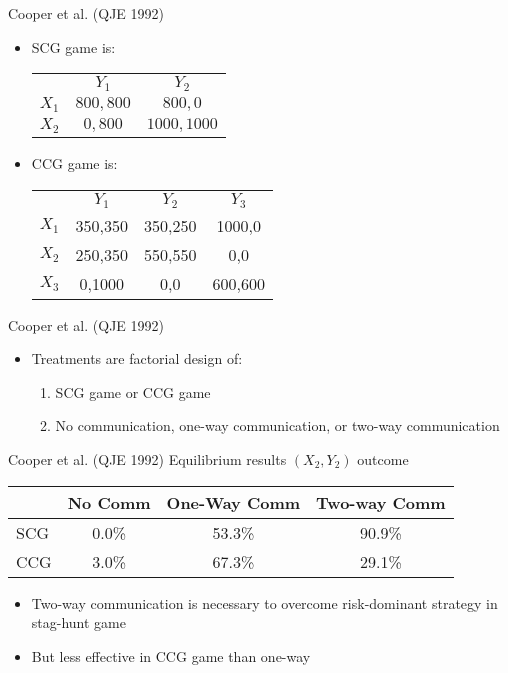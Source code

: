 \documentclass{beamer}
\begin{document}
\begin{frame}{Cooper et al. (QJE 1992)}
	\begin{itemize}
		\item SCG game is:
		\begin{center}
		\begin{tabular}{r|c|c|}
				\multicolumn{1}{r}{}& \multicolumn{1}{c}{$Y_1$}  & \multicolumn{1}{c}{$Y_2$} \\ \cline{2-3}
				$X_1$ &  $800,800$ & $800,0$ \\ \cline{2-3}
				$X_2$ &  $0,800$ & $1000,1000$ \\ \cline{2-3}
\end{tabular}
\end{center}
		\item CCG game is:
		\begin{center}
			\begin{tabular}{r|c|c|c|}
				\multicolumn{1}{r}{ } & \multicolumn{1}{c}{$Y_1$}  & \multicolumn{1}{c}{$Y_2$} & \multicolumn{1}{c}{$Y_3$} \\ \cline{2-4}
				$X_1$ &  350,350 & 350,250  & 1000,0 \\ \cline{2-4}
				$X_2$ &  250,350 & 550,550  & 0,0 \\ \cline{2-4}
				$X_3$ &  0,1000 & 0,0  & 600,600  \\ \cline{2-4}
			\end{tabular}
		\end{center}
	\end{itemize}
\end{frame}

\begin{frame}{Cooper et al. (QJE 1992)}
	\begin{itemize}
		\item Treatments are factorial design of:
			\begin{enumerate}
				\item SCG game or CCG game
				\item No communication, one-way communication, or two-way communication
			\end{enumerate}
	\end{itemize}
\end{frame}

\begin{frame}{Cooper et al. (QJE 1992)}
	Equilibrium results $(X_2,Y_2)$ outcome
			\begin{center}
			\begin{tabular}{lccc}
			\hline & No Comm & One-Way Comm & Two-way Comm \\ \hline
			SCG    &  0.0\%	 & 53.3\%       &  90.9\% \\
			CCG    &  3.0\%	 & 67.3\%       &  29.1\%
			\\\hline
			\end{tabular}\end{center}
		\begin{itemize}
			\item Two-way communication is necessary to overcome risk-dominant strategy in stag-hunt game
			\item But less effective in CCG game than one-way
		\end{itemize}
\end{frame}
\end{document}
